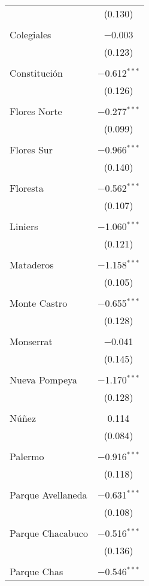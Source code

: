 \begin{table}[!htbp]
\begin{tabular}{@{\extracolsep{5pt}}lc}
  & (0.130) \\ 
  & \\ 
 Colegiales & $-$0.003 \\ 
  & (0.123) \\ 
  & \\ 
 Constitución & $-$0.612$^{***}$ \\ 
  & (0.126) \\ 
  & \\ 
 Flores Norte & $-$0.277$^{***}$ \\ 
  & (0.099) \\ 
  & \\ 
 Flores Sur & $-$0.966$^{***}$ \\ 
  & (0.140) \\ 
  & \\ 
 Floresta & $-$0.562$^{***}$ \\ 
  & (0.107) \\ 
  & \\ 
 Liniers & $-$1.060$^{***}$ \\ 
  & (0.121) \\ 
  & \\ 
 Mataderos & $-$1.158$^{***}$ \\ 
  & (0.105) \\ 
  & \\ 
 Monte Castro & $-$0.655$^{***}$ \\ 
  & (0.128) \\ 
  & \\ 
 Monserrat & $-$0.041 \\ 
  & (0.145) \\ 
  & \\ 
 Nueva Pompeya & $-$1.170$^{***}$ \\ 
  & (0.128) \\ 
  & \\ 
 Núñez & 0.114 \\ 
  & (0.084) \\ 
  & \\ 
 Palermo & $-$0.916$^{***}$ \\ 
  & (0.118) \\ 
  & \\ 
 Parque Avellaneda & $-$0.631$^{***}$ \\ 
  & (0.108) \\ 
  & \\ 
 Parque Chacabuco & $-$0.516$^{***}$ \\ 
  & (0.136) \\ 
  & \\ 
 Parque Chas & $-$0.546$^{***}$ \\ 

\end{tabular}
\end{table}
